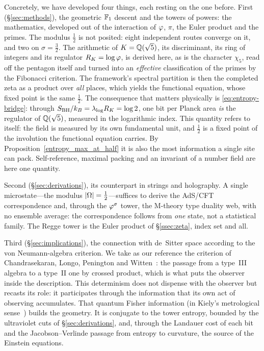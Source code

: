 Concretely, we have developed four things, each resting on the one before. First
(\S\ref{sec:methods}), the geometric $\mathbb{F}_1$ descent and the towers of powers: the mathematics,
developed out of the interaction of $\varphi$, $\pi$, the Euler product and the primes. The
modulus $\tfrac12$ is not posited: eight independent routes converge on it, and two on
$\sigma=\tfrac32$. The arithmetic of $K=\mathbb{Q}(\sqrt5)$, its discriminant, its ring of integers
and its regulator $R_K=\log\varphi$, is derived here, as is the character $\chi_5$, read off
the pentagon itself and turned into an \emph{effective} classification of the primes by the
Fibonacci criterion. The framework's spectral partition is then the completed zeta as a
product over \emph{all} places, which yields the functional equation, whose fixed point is the
same $\tfrac12$. The consequence that matters physically is \eqref{eq:entropy-bridge}: through
$S_{\mathrm{BH}}/k_B=\lambda_{\log} R_K=\log2$, one bit per Planck area \emph{is} the regulator of $\mathbb{Q}(\sqrt5)$,
measured in the logarithmic index. This quantity refers to itself: the field is measured by
its own fundamental unit, and $\tfrac12$ is a fixed point of the involution the functional
equation carries. By Proposition~\ref{entropy_max_at_half} it is also the most information a
single site can pack. Self-reference, maximal packing and an invariant of a number field are
here one quantity.

Second (\S\ref{sec:derivations}), its counterpart in strings and holography. A single
microstate---the modulus $|\Omega|=\tfrac12$---suffices to derive the AdS/CFT correspondence and,
through the $\varphi^{\sigma}$ tower, the M-theory type duality web, with no ensemble average:
the correspondence follows from \emph{one} state, not a statistical family. The Regge tower is
the Euler product of \S\ref{ssec:zeta}, index set and all.

Third (\S\ref{sec:implications}), the connection with de~Sitter space according to the von
Neumann-algebra criterion. We take as our reference the criterion of Chandrasekaran, Longo,
Penington and Witten~\cite{CLPW22}: the passage from a type~III algebra to a type~II one by
crossed product, which is what puts the observer inside the description. This determinism does
not dispense with the observer but recasts its role: it participates through the information
that its own act of observing accumulates. That quantum Fisher information (in Kiely's
metrological sense~\cite{Kiely26}) builds the geometry. It is conjugate to the tower entropy,
bounded by the ultraviolet cuts of \S\ref{sec:derivations}, and, through the Landauer cost of
each bit and the Jacobson--Verlinde passage from entropy to curvature, the source of the
Einstein equations.

